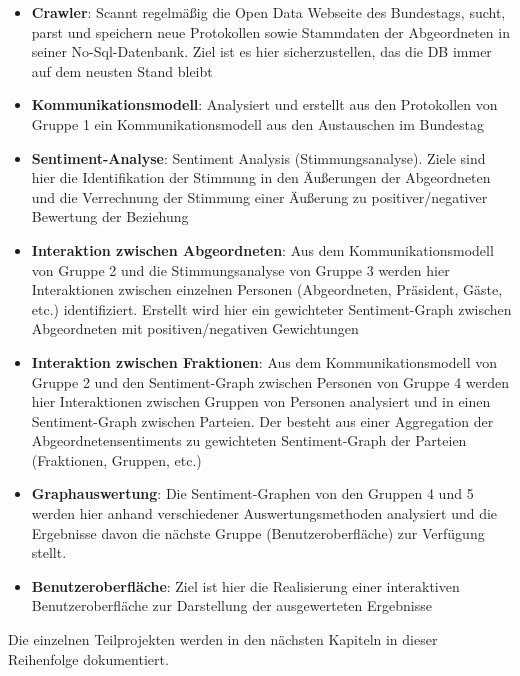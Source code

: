 \begin{itemize}
  \item \textbf{Crawler}: Scannt regelmäßig die Open Data Webseite des Bundestags, sucht, parst und speichern neue Protokollen sowie Stammdaten der Abgeordneten in seiner No-Sql-Datenbank. Ziel ist es hier sicherzustellen, das die DB immer auf dem neusten Stand bleibt
  \item \textbf{Kommunikationsmodell}: Analysiert und erstellt aus den Protokollen von Gruppe 1 ein Kommunikationsmodell aus den Austauschen im Bundestag
  \item \textbf{Sentiment-Analyse}: Sentiment Analysis (Stimmungsanalyse). Ziele sind hier die Identifikation der Stimmung in den Äußerungen der Abgeordneten und die Verrechnung der Stimmung einer Äußerung zu positiver/negativer Bewertung der Beziehung
  \item \textbf{Interaktion zwischen Abgeordneten}: Aus dem Kommunikationsmodell von Gruppe 2 und die Stimmungsanalyse von Gruppe 3 werden hier Interaktionen zwischen einzelnen Personen (Abgeordneten, Präsident, Gäste, etc.) identifiziert. Erstellt wird hier ein gewichteter Sentiment-Graph zwischen Abgeordneten mit positiven/negativen Gewichtungen
  \item \textbf{Interaktion zwischen Fraktionen}: Aus dem Kommunikationsmodell von Gruppe 2 und den Sentiment-Graph zwischen Personen von Gruppe 4 werden hier Interaktionen zwischen Gruppen von Personen analysiert und in einen Sentiment-Graph zwischen Parteien. Der besteht aus einer Aggregation der Abgeordnetensentiments zu gewichteten Sentiment-Graph der Parteien (Fraktionen, Gruppen, etc.)
  \item \textbf{Graphauswertung}: Die Sentiment-Graphen von den Gruppen 4 und 5 werden hier anhand verschiedener Auswertungsmethoden analysiert und die Ergebnisse davon die nächste Gruppe (Benutzeroberfläche) zur Verfügung stellt. 
  \item \textbf{Benutzeroberfläche}: Ziel ist hier die Realisierung einer interaktiven Benutzeroberfläche zur Darstellung der ausgewerteten Ergebnisse
\end{itemize}

Die einzelnen Teilprojekten werden in den nächsten Kapiteln in dieser Reihenfolge dokumentiert. 